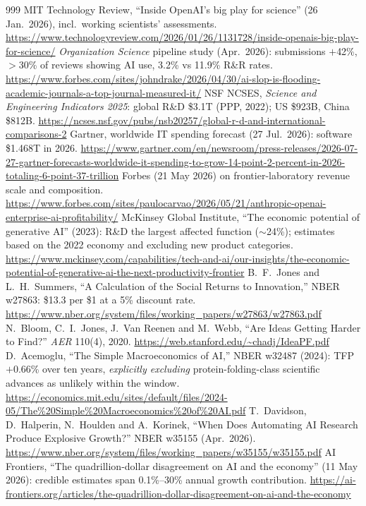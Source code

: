 \begin{thebibliography}{999}
 MIT Technology Review, ``Inside OpenAI's big play for science'' (26 Jan.\ 2026), incl.\ working scientists' assessments. \url{https://www.technologyreview.com/2026/01/26/1131728/inside-openais-big-play-for-science/}
 \emph{Organization Science} pipeline study (Apr.\ 2026): submissions $+$42\%, $>$30\% of reviews showing AI use, 3.2\% vs 11.9\% R\&R rates. \url{https://www.forbes.com/sites/johndrake/2026/04/30/ai-slop-is-flooding-academic-journals-a-top-journal-measured-it/}
 NSF NCSES, \emph{Science and Engineering Indicators 2025}: global R\&D \$3.1T (PPP, 2022); US \$923B, China \$812B. \url{https://ncses.nsf.gov/pubs/nsb20257/global-r-d-and-international-comparisons-2}
 Gartner, worldwide IT spending forecast (27 Jul.\ 2026): software \$1.468T in 2026. \url{https://www.gartner.com/en/newsroom/press-releases/2026-07-27-gartner-forecasts-worldwide-it-spending-to-grow-14-point-2-percent-in-2026-totaling-6-point-37-trillion}
 Forbes (21 May 2026) on frontier-laboratory revenue scale and composition. \url{https://www.forbes.com/sites/paulocarvao/2026/05/21/anthropic-openai-enterprise-ai-profitability/}
 McKinsey Global Institute, ``The economic potential of generative AI'' (2023): R\&D the largest affected function ($\sim$24\%); estimates based on the 2022 economy and excluding new product categories. \url{https://www.mckinsey.com/capabilities/tech-and-ai/our-insights/the-economic-potential-of-generative-ai-the-next-productivity-frontier}
 B.~F.~Jones and L.~H.~Summers, ``A Calculation of the Social Returns to Innovation,'' NBER w27863: \$13.3 per \$1 at a 5\% discount rate. \url{https://www.nber.org/system/files/working_papers/w27863/w27863.pdf}
 N.~Bloom, C.~I.~Jones, J.~Van Reenen and M.~Webb, ``Are Ideas Getting Harder to Find?'' \emph{AER} 110(4), 2020. \url{https://web.stanford.edu/~chadj/IdeaPF.pdf}
 D.~Acemoglu, ``The Simple Macroeconomics of AI,'' NBER w32487 (2024): TFP $+$0.66\% over ten years, \emph{explicitly excluding} protein-folding-class scientific advances as unlikely within the window. \url{https://economics.mit.edu/sites/default/files/2024-05/The\%20Simple\%20Macroeconomics\%20of\%20AI.pdf}
 T.~Davidson, D.~Halperin, N.~Houlden and A.~Korinek, ``When Does Automating AI Research Produce Explosive Growth?'' NBER w35155 (Apr.\ 2026). \url{https://www.nber.org/system/files/working_papers/w35155/w35155.pdf}
 AI Frontiers, ``The quadrillion-dollar disagreement on AI and the economy'' (11 May 2026): credible estimates span 0.1\%--30\% annual growth contribution. \url{https://ai-frontiers.org/articles/the-quadrillion-dollar-disagreement-on-ai-and-the-economy}

\end{thebibliography}
